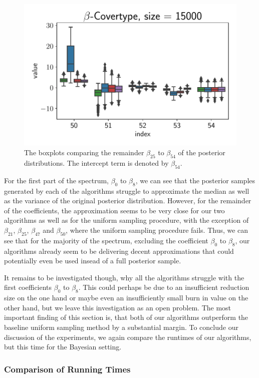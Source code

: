 \begin{figure}[ht!]
    \includegraphics[width=.49\linewidth]{figures/covertype_coefficients/covertype_coefficients_50.pdf}
    \caption{The boxplots comparing the remainder $\beta_{25}$
        to $\beta_{54}$ of the posterior distributions.
        The intercept term is denoted by $\beta_{54}$.}
    \label{fig:covertype-coefficients-2}
\end{figure}

For the first part of the spectrum, $\beta_0$ to $\beta_{8}$, we
can see that the posterior samples generated by
each of the algorithms struggle to approximate the median
as well as the variance of the original posterior distribution.
However, for the remainder of the coefficients, the approximation
seems to be very close for our two algorithms as well as for
the uniform sampling procedure, with the exception of
$\beta_{21}$, $\beta_{25}$, $\beta_{47}$ and $\beta_{50}$,
where the uniform sampling procedure fails.
Thus, we can see that for the majority of the spectrum, excluding
the coefficient $\beta_0$ to $\beta_{8}$, our algorithms already
seem to be delivering decent approximations that could potentially
even be used insead of a full posterior sample.

It remains to be investigated though, why all the algorithms struggle
with the first coefficients $\beta_0$ to $\beta_8$.
This could perhaps be due to an insufficient reduction size on
the one hand or maybe even an insufficiently small burn in value
on the other hand, but we leave this investigation as an open
problem. The most important finding of this section is, that both
of our algorithms outperform the baseline uniform sampling method
by a substantial margin.
To conclude our discussion of the experiments, we again compare
the runtimes of our algorithms, but this time for the
Bayesian setting.

\subsubsection{Comparison of Running Times}

